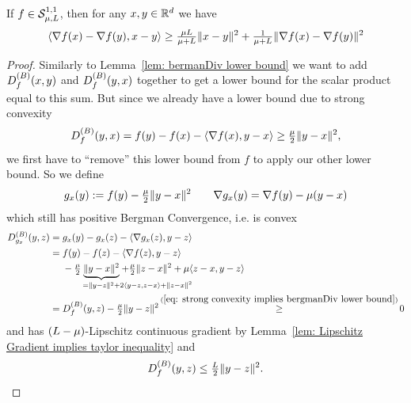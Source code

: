 \begin{lemma}
	\label{lem: bermanDiv lower bound (strongly convex)}
	If \(f\in\mathcal{S}^{1,1}_{{\mu},{L}}\), then for any
	\(x,y\in\mathbb{R}^d\) we have
	\begin{align*}
		\langle \nabla f(x) - \nabla f(y), x-y\rangle 
		\ge \tfrac{\mu L}{\mu+L} \| x-y\|^2
		+ \tfrac{1}{\mu+L}\|\nabla f(x) -\nabla f(y)\|^2
	\end{align*}
\end{lemma}
\begin{proof}
	Similarly to Lemma~\ref{lem: bermanDiv lower bound} we want to
	add \(D^{(B)}_{f}(x,y)\) and \(D^{(B)}_{f}(y,x)\) together to
	get a lower bound for the scalar product equal to this sum. But since we
	already have a lower bound due to strong convexity
	\begin{align}\label{eq: strong convexity implies bergmanDiv lower bound}
		D^{(B)}_{f}(y,x) = f(y) - f(x) -\langle\nabla f(x), y-x\rangle
		\ge \tfrac{\mu}2 \|y-x\|^2,
	\end{align}
	we first have to ``remove'' this lower bound from \(f\) to apply our other
	lower bound. So we define
	\begin{align*}
		g_x(y) := f(y) - \tfrac{\mu}2\|y-x\|^2 \qquad
		\nabla g_x(y) = \nabla f(y) - \mu(y-x)
	\end{align*}
	which still has positive Bergman Convergence, i.e. is convex
	\begin{align*}
		\bergmanDiv{g_x}(y,z)
		&= g_x(y) - g_x(z) - \langle\nabla g_x(z), y-z\rangle \\
		&= 
		\begin{aligned}[t]
			& f(y) - f(z) -\langle\nabla f(z), y-z\rangle \\
			&- \tfrac\lbound{2}\underbrace{\|y-x\|^2}_{
				=\|y-z\|^2 + \mathrlap{2\langle y-z, z-x\rangle + \|z-x\|^2}
			}
			+ \tfrac\lbound{2}\|z-x\|^2
			+ \lbound\langle z-x, y-z\rangle
		\end{aligned}\\
		&= \bergmanDiv{f}(y,z) - \tfrac{\lbound}2\|y-z\|^2
		\xge{(\ref{eq: strong convexity implies bergmanDiv lower bound})} 0
	\end{align*}
	and has \((L-\mu)\)-Lipschitz continuous gradient by
	Lemma~\ref{lem: Lipschitz Gradient implies taylor inequality} and 
	\begin{align}
		\label{eq: bergmanDiv upper bound}
		D^{(B)}_{f}(y,z) \le \tfrac{L}2\|y-z\|^2.
	\end{align}

\end{proof}
